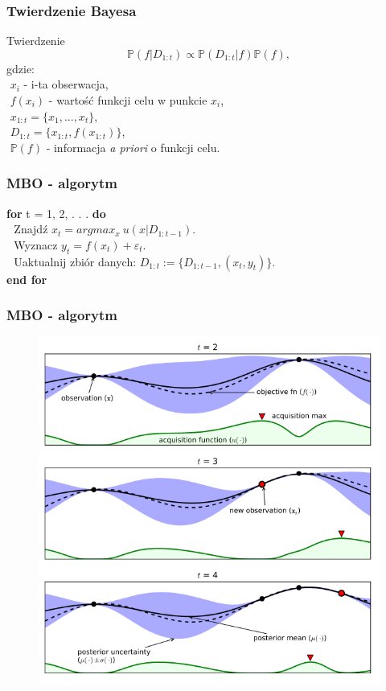 \documentclass[handout]{beamer}
\begin{document}
\begin{frame}
\frametitle{Twierdzenie Bayesa}
\begin{block}{Twierdzenie}
\begin{equation*}
\mathbb{P}(f|D_{1:t}) \propto \mathbb{P} (D_{1:t}|f) \mathbb{P}(f),
\end{equation*}
gdzie: \\
$ $ $x_i$ - i-ta obserwacja, \\
$ $ $f(x_i)$ - wartość funkcji celu w punkcie $x_i$, \\
$ $ $x_{1:t} = \{ x_1, ..., x_t \}$, \\
$ $ $D_{1:t} = \{ x_{1:t}, f(x_{1:t}) \}$,  \\
$ $ $\mathbb{P}(f)$ - informacja \textit{a priori} o funkcji celu.
\end{block}
\end{frame}

\begin{frame}
\frametitle{MBO - algorytm}
\begin{block}{}
\textbf{for} t = 1, 2, . . . \textbf{do} \\
$ $ $ $ Znajdź $x_t = argmax_x \ u(x|D_{1:t-1})$. \\
$ $ $ $ Wyznacz $y_t = f(x_t) + \varepsilon_t$. \\
$ $ $ $ Uaktualnij zbiór danych: $D_{1:t} := \{D_{1:t-1}, (x_t, y_t)\}$. \\
\textbf{end for}
\end{block}
\end{frame}

\begin{frame}
\frametitle{MBO - algorytm}
\begin{center}
\begin{figure}
\includegraphics[scale=0.46]{alg.png}
\end{figure}
\end{center}
\end{frame}
\end{document}
